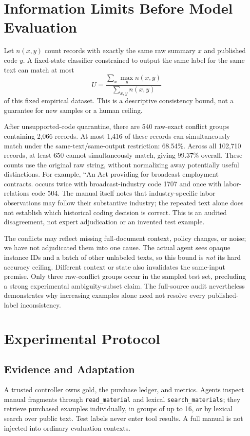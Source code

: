 \documentclass[11pt]{article}
\begin{document}
\section{Information Limits Before Model Evaluation}
Let $n(x,y)$ count records with exactly the same raw summary $x$ and published code $y$. A fixed-state classifier constrained to output the same label for the same text can match at most
\begin{equation}
 U=\frac{\sum_x\max_y n(x,y)}{\sum_{x,y}n(x,y)}
\end{equation}
of this fixed empirical dataset. This is a descriptive consistency bound, not a guarantee for new samples or a human ceiling.

After unsupported-code quarantine, there are 540 raw-exact conflict groups containing 2,066 records. At most 1,416 of these records can simultaneously match under the same-text/same-output restriction: 68.54\%. Across all 102,710 records, at least 650 cannot simultaneously match, giving 99.37\% overall. These counts use the original raw string, without normalizing away potentially useful distinctions. For example, ``An Act providing for broadcast employment contracts. occurs twice with broadcast-industry code 1707 and once with labor-relations code 504. The manual itself notes that industry-specific labor observations may follow their substantive industry; the repeated text alone does not establish which historical coding decision is correct. This is an audited disagreement, not expert adjudication or an invented test example.

The conflicts may reflect missing full-document context, policy changes, or noise; we have not adjudicated them into one cause. The actual agent sees opaque instance IDs and a batch of other unlabeled texts, so this bound is \emph{not} its hard accuracy ceiling. Different context or state also invalidates the same-input premise. Only three raw-conflict groups occur in the sampled test set, precluding a strong experimental ambiguity-subset claim. The full-source audit nevertheless demonstrates why increasing examples alone need not resolve every published-label inconsistency.

\section{Experimental Protocol}
\subsection{Evidence and Adaptation}
A trusted controller owns gold, the purchase ledger, and metrics. Agents inspect manual fragments through \texttt{read\_material} and lexical \texttt{search\_materials}; they retrieve purchased examples individually, in groups of up to 16, or by lexical search over public text. Test labels never enter tool results. A full manual is not injected into ordinary evaluation contexts.
\end{document}
